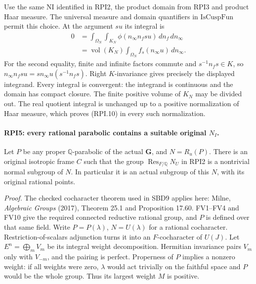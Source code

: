 Use the same \(\mathrm{NI}\) identified in RPI2, the product
domain from RPI3 and product Haar measure.  The universal
measure and domain quantifiers in \(\mathrm{IsCuspFun}\) permit
this choice.  At the argument \(su\) its integral is
\[
 \begin{split}
 0&=\int_{\Omega_N}\int_{K_N}
             \phi(n_\infty n_fsu)\,dn_f\,dn_\infty\\
  &=\operatorname{vol}(K_N)\int_{\Omega_N}
                                      f_s(n_\infty u)\,dn_\infty .
 \end{split}
 \tag{RPI.12}
\]
For the second equality, finite and infinite factors commute and
\(s^{-1}n_fs\in K\), so
\(n_\infty n_fsu=sn_\infty u(s^{-1}n_fs)\).
Right \(K\)-invariance gives precisely the displayed integrand.
Every integral is convergent: the integrand is continuous and
the domain has compact closure.  The finite positive volume
of \(K_N\) may be divided out.  The real quotient integral is
unchanged up to a positive normalization of Haar measure,
which proves (RPI.10) in every such normalization.

\paragraph{RPI5: every rational parabolic contains a suitable original \(N_I\).}
\label{claim:RPI5}
Let \(P\) be any proper \(\mathbb Q\)-parabolic of the actual
\(\mathbf G\), and \(N=R_u(P)\).  There is an original isotropic
frame \(C\) such that the group
\(\operatorname{Res}_{F/\mathbb Q}N_U\) in RPI2 is a nontrivial
normal subgroup of \(N\).  In particular it is an actual
subgroup of this \(N\), with its original rational points.

\emph{Proof.}
The checked cocharacter theorem used in SBD9 applies here:
Milne, \emph{Algebraic Groups} (2017), Theorem 25.1 and
Proposition 17.60.  FV1--FV4 and FV10 give the required
connected reductive rational group, and \(P\) is defined over
that same field.  Write \(P=P(\lambda)\), \(N=U(\lambda)\)
for a rational cocharacter.  Restriction-of-scalars adjunction
turns it into an \(F\)-cocharacter of \(U(J)\).
Let \(E^n=\bigoplus_m V_m\) be its integral weight decomposition.
Hermitian invariance pairs \(V_m\) only with \(V_{-m}\), and
the pairing is perfect.  Properness of \(P\) implies a
nonzero weight: if all weights were zero, \(\lambda\) would
act trivially on the faithful space and \(P\) would be the
whole group.  Thus its largest weight \(M\) is positive.

